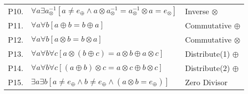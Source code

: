 \documentclass[12pt, a4paper]{article}
\begin{document}
\begin{table}[h!]
\begin{center}
\begin{tabular}{l l l}
        P10.& $\forall a\exists a^{-1}_{\otimes}[a\neq e_{\oplus}\wedge a\otimes a^{-1}_{\otimes}=a^{-1}_{\otimes}\otimes a=e_{\otimes}]$ & Inverse $\otimes$\\
        
        P11.& $\forall a\forall b[a\oplus b=b\oplus a]$ & Commutative $\oplus$\\
        
        P12.& $\forall a\forall b[a\otimes b=b\otimes a]$ & Commutative $\otimes$\\
        
        P13. & $\forall a\forall b\forall c[a\otimes(b\oplus c)=a\otimes b\oplus a\otimes c]$ & Distribute(1) $\oplus$\\
        
        P14.& $\forall a\forall b\forall c[(a\oplus b)\otimes c=a\otimes c\oplus b\otimes c]$ & Distribute(2) $\oplus$\\
        
        P15.& $\exists a\exists b[a\neq e_{\oplus}\wedge b\neq e_{\oplus}\wedge(a\otimes b=e_{\oplus})]$ & Zero Divisor\\
        
        
        \hline
        \end{tabular}
    \end{center}
\end{table}

\newpage
\end{document}
